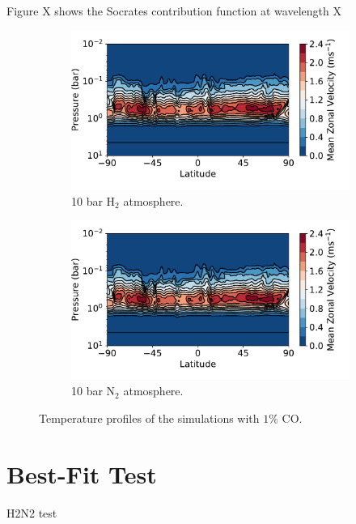 Figure X shows the Socrates contribution function at wavelength X

\begin{figure}
  \centering
  \begin{subfigure}[t]{0.49\textwidth}
    \includegraphics[width=\textwidth]{figures/soc-lava-planets/h2-cf.pdf}
    \caption{10 bar H$_{2}$ atmosphere.}\label{fig:soc-tp-h2}
  \end{subfigure}
  \begin{subfigure}[t]{0.49\textwidth}
    \includegraphics[width=\textwidth]{figures/soc-lava-planets/h2-cf.pdf}
    \caption{10 bar N$_{2}$ atmosphere.}\label{fig:soc-tp-n2}
  \end{subfigure}
  \caption{Temperature profiles of the simulations with $1\%$ CO.}
  \label{fig:soc-tp}
\end{figure}


\section{Best-Fit Test}

H2N2 test

